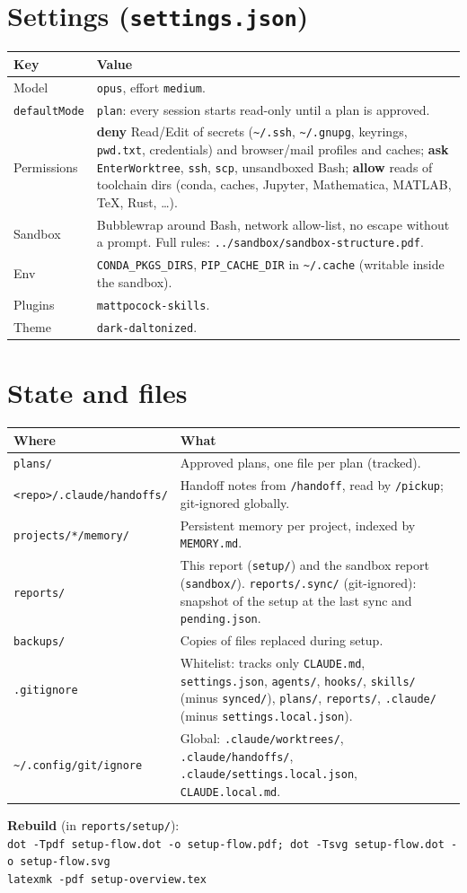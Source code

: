 \documentclass[10pt,a4paper]{article}
\newcommand{\p}[1]{\nolinkurl{#1}}
\begin{document}
\section{Settings (\texttt{settings.json})}
\begin{tabularx}{\linewidth}{@{}l L@{}}
\toprule
\textbf{Key} & \textbf{Value} \\
\midrule
Model & \p{opus}, effort \p{medium}. \\
\p{defaultMode} & \p{plan}: every session starts read-only until a plan is approved. \\
Permissions & \textbf{deny} Read/Edit of secrets (\p{~/.ssh}, \p{~/.gnupg}, keyrings, \p{pwd.txt}, credentials) and
  browser/mail profiles and caches; \textbf{ask} \p{EnterWorktree}, \p{ssh}, \p{scp}, unsandboxed Bash;
  \textbf{allow} reads of toolchain dirs (conda, caches, Jupyter, Mathematica, MATLAB, TeX, Rust, \dots). \\
Sandbox & Bubblewrap around Bash, network allow-list, no escape without a prompt. Full rules:
  \p{../sandbox/sandbox-structure.pdf}. \\
Env & \p{CONDA_PKGS_DIRS}, \p{PIP_CACHE_DIR} in \p{~/.cache} (writable inside the sandbox). \\
Plugins & \p{mattpocock-skills}. \\
Theme & \p{dark-daltonized}. \\
\bottomrule
\end{tabularx}

\section{State and files}
\begin{tabularx}{\linewidth}{@{}l L@{}}
\toprule
\textbf{Where} & \textbf{What} \\
\midrule
\p{plans/} & Approved plans, one file per plan (tracked). \\
\p{<repo>/.claude/handoffs/} & Handoff notes from \p{/handoff}, read by \p{/pickup}; git-ignored globally. \\
\p{projects/*/memory/} & Persistent memory per project, indexed by \p{MEMORY.md}. \\
\p{reports/} & This report (\p{setup/}) and the sandbox report (\p{sandbox/}). \p{reports/.sync/} (git-ignored): snapshot of the
  setup at the last sync and \p{pending.json}. \\
\p{backups/} & Copies of files replaced during setup. \\
\p{.gitignore} & Whitelist: tracks only \p{CLAUDE.md}, \p{settings.json}, \p{agents/}, \p{hooks/}, \p{skills/}
  (minus \p{synced/}), \p{plans/}, \p{reports/}, \p{.claude/} (minus \p{settings.local.json}). \\
\p{~/.config/git/ignore} & Global: \p{.claude/worktrees/}, \p{.claude/handoffs/}, \p{.claude/settings.local.json},
  \p{CLAUDE.local.md}. \\
\bottomrule
\end{tabularx}

\medskip\noindent\textbf{Rebuild} (in \p{reports/setup/}):\\
\texttt{dot -Tpdf setup-flow.dot -o setup-flow.pdf; dot -Tsvg setup-flow.dot -o setup-flow.svg}\\
\texttt{latexmk -pdf setup-overview.tex}
\end{document}
